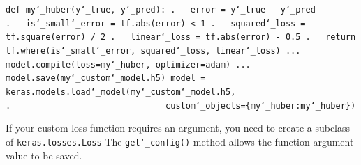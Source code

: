 \texttt{def my\char`_huber(y\char`_true, y\char`_pred):\newline
.~~~error = y\char`_true - y\char`_pred\newline
.~~~is\char`_small\char`_error = tf.abs(error) < 1\newline
.~~~squared\char`_loss = tf.square(error) / 2\newline
.~~~linear\char`_loss = tf.abs(error) - 0.5\newline
.~~~return tf.where(is\char`_small\char`_error, squared\char`_loss, linear\char`_loss)\newline
...\newline
model.compile(loss=my\char`_huber, optimizer=\textquotesingle adam\textquotesingle)\newline
...\newline
model.save(\textquotesingle my\char`_custom\char`_model.h5\textquotesingle)\newline
model = keras.models.load\char`_model(\textquotesingle my\char`_custom\char`_model.h5\textquotesingle,\newline
.~~~~~~~~~~~~~~~~~~~~~~~~~~~~~~~custom\char`_objects=\{\textquotesingle my\char`_huber\textquotesingle:my\char`_huber\})}\newline

If your custom loss function requires an argument,
you need to create a subclass of \texttt{keras.losses.Loss}
The \texttt{get\char`_config()} method allows the function argument value to be saved.


